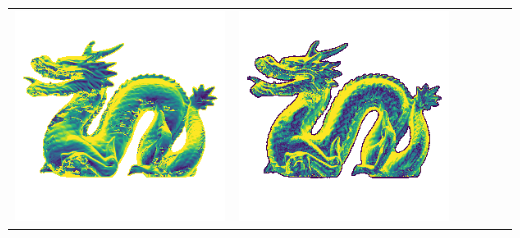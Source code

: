 \begin{tabularx}{\linewidth}{@{}Y@{}Y@{}Y@{}Y@{}Y@{}Y@{}}
\includegraphics[width=\linewidth]{semisynthetic/20150514_21_yu_err.png} &
\includegraphics[width=\linewidth]{semisynthetic/20150514_21_dpsn_err.png} &

\end{tabularx}
